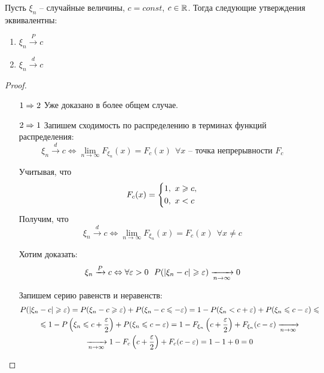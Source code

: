 \begin{lemma}
    Пусть $\xi_n$ -- случайные величины, $c = const$, $c \in \mathbb{R}$. Тогда следующие утверждения эквивалентны:
    \begin{enumerate}
        \item $\xi_n \xrightarrow{P} c$
        \item $\xi_n \xrightarrow{d} c$
    \end{enumerate}
\end{lemma}

\begin{proof}~
    \begin{itemize}
        \item[$1 \Rightarrow 2$] Уже доказано в более общем случае.

        \item[$2 \Rightarrow 1$] Запишем сходимость по распределению в терминах функций распределения:
        \[
            \xi_n \xrightarrow{d} c \Leftrightarrow \lim_{n \to \infty} F_{\xi_n}(x) = F_c(x) \ \ \forall x \text{ -- точка непрерывности } F_c
        \]

        Учитывая, что
        \[
            F_c(x) = \left\{\begin{aligned}
                        & 1,\ x \geqslant c,
                        \\
                        & 0,\ x < c
                    \end{aligned}\right.
        \]
        Получим, что
        \[
            \xi_n \xrightarrow{d} c \Leftrightarrow \lim_{n \to \infty} F_{\xi_n}(x) = F_c(x) \ \ \forall x \neq c
        \]

        Хотим доказать:
        \[
            \xi_n \xrightarrow{P} c \Leftrightarrow \forall \varepsilon > 0\ \ P(|\xi_n - c| \geqslant \varepsilon) \xrightarrow[n \to \infty]{} 0
        \]

        Запишем серию равенств и неравенств:
        \begin{multline*}
            P(|\xi_n - c| \geqslant \varepsilon) = P(\xi_n - c \geqslant \varepsilon) + P(\xi_n - c \leqslant -\varepsilon) = 1 - P(\xi_n < c + \varepsilon) + P(\xi_n \leqslant c - \varepsilon) \leqslant
            \\
            \leqslant 1 - P \left( \xi_n \leqslant c + \frac{\varepsilon}{2} \right) + P(\xi_n \leqslant c - \varepsilon) = 1 - F_{\xi_n} \left( c + \frac{\varepsilon}{2} \right) + F_{\xi_n}(c - \varepsilon) \xrightarrow[n \to \infty]{}
            \\
            \xrightarrow[n \to \infty]{} 1 - F_c \left( c + \frac{\varepsilon}{2} \right) + F_c(c - \varepsilon) = 1 - 1 + 0 = 0
        \end{multline*}
    \end{itemize}
\end{proof}

